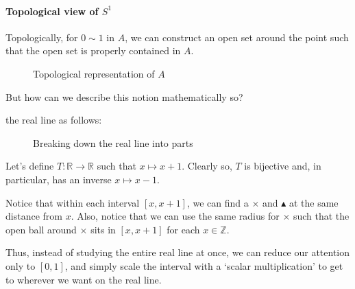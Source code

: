 \documentclass[notoc,notitlepage]{tufte-book}
\begin{document}
\paragraph{Topological view of $S^1$}
Topologically, for $0 \sim 1$ in $A$, we can construct an open set around the
point such that the open set is properly contained in $A$.

\begin{figure}[ht]
  \centering
  \caption{Topological representation of $A$}
  \label{fig:topological_representation_of_a}
\end{figure}

But how can we describe this notion mathematically so?

 the real line as follows:

\begin{figure}[ht]
  \centering
  \caption{Breaking down the real line into parts}
  \label{fig:breaking_down_the_real_line_into_parts}
\end{figure}

Let's define $T : \mathbb{R} \to \mathbb{R}$ such that $x \mapsto x + 1$. Clearly
so, $T$ is bijective and, in particular, has an inverse $x \mapsto x - 1$.

Notice that within each interval $[x, x + 1]$, we can find a $\times$ and
$\blacktriangle$ at the same distance from $x$. Also, notice that we can use the
same radius for $\times$ such that the open ball around $\times$ sits in $[x, x + 1]$
for each $x \in \mathbb{Z}$.

Thus, instead of studying the entire real line at once, we can reduce our attention
only to $[0, 1]$, and simply scale the interval with a `scalar multiplication' to
get to wherever we want on the real line.
\end{document}
